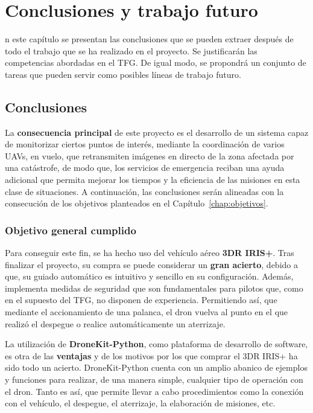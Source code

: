 \chapter{Conclusiones y trabajo futuro}
\label{chap:conclusiones}

n este capítulo se presentan las conclusiones que se pueden extraer después de todo el trabajo que se ha realizado en el proyecto. Se justificarán las competencias abordadas en el \acs{TFG}. De igual modo, se propondrá un conjunto de tareas que pueden servir como posibles líneas de trabajo futuro.

\section{Conclusiones}
\label{sec:conclusiones}

La \textbf{consecuencia principal} de este proyecto es el desarrollo de un sistema capaz de monitorizar ciertos puntos de interés, mediante la coordinación de varios \acs{UAV}s, en vuelo, que retransmiten imágenes en directo de la zona afectada por una catástrofe, de modo que, los servicios de emergencia reciban una ayuda adicional que permita mejorar los tiempos y la eficiencia de las misiones en esta clase de situaciones. A continuación, las conclusiones serán alineadas con la consecución de los objetivos planteados en el Capítulo~\ref{chap:objetivos}.

\subsection{Objetivo general cumplido}

Para conseguir este fin, se ha hecho uso del vehículo aéreo \textbf{3DR IRIS+}. Tras finalizar el proyecto, su compra se puede considerar un \textbf{gran acierto}, debido a que, su guiado automático es intuitivo y sencillo en su configuración. Además, implementa medidas de seguridad que son fundamentales para pilotos que, como en el supuesto del \acs{TFG}, no disponen de experiencia. Permitiendo así, que mediante el accionamiento de una palanca, el dron vuelva al punto en el que realizó el despegue o realice automáticamente un aterrizaje. 

La utilización de \textbf{DroneKit-Python}, como plataforma de desarrollo de software, es otra de las \textbf{ventajas} y de los motivos por los que comprar el 3DR IRIS+ ha sido todo un acierto. DroneKit-Python cuenta con un amplio abanico de ejemplos y funciones para realizar, de una manera simple, cualquier tipo de operación con el dron. Tanto es así, que permite llevar a cabo procedimientos como la conexión con el vehículo, el despegue, el aterrizaje, la elaboración de misiones, etc.

